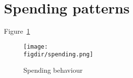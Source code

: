 


\section{Spending patterns}%
\label{sec:spending_patterns}

Figure~\ref{fig:spending}
\begin{figure}[H]
    \center \newcommand\width{\textwidth} \caption{Spending behaviour}
    \label{fig:spending}
    \texttt{[image: \\figdir/spending.png]}
\end{figure}





